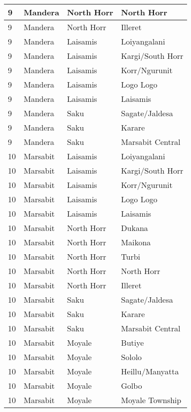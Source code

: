 \begin{table}[!ht]
\begin{tabular}{|l|l|l|l|}
        9 & Mandera & North Horr & North Horr \\ \hline
        9 & Mandera & North Horr & Illeret \\ \hline
        9 & Mandera & Laisamis & Loiyangalani \\ \hline
        9 & Mandera & Laisamis & Kargi/South Horr \\ \hline
        9 & Mandera & Laisamis & Korr/Ngurunit \\ \hline
        9 & Mandera & Laisamis & Logo Logo \\ \hline
        9 & Mandera & Laisamis & Laisamis \\ \hline
        9 & Mandera & Saku & Sagate/Jaldesa \\ \hline
        9 & Mandera & Saku & Karare \\ \hline
        9 & Mandera & Saku & Marsabit Central \\ \hline
        10 & Marsabit & Laisamis & Loiyangalani \\ \hline
        10 & Marsabit & Laisamis & Kargi/South Horr \\ \hline
        10 & Marsabit & Laisamis & Korr/Ngurunit \\ \hline
        10 & Marsabit & Laisamis & Logo Logo \\ \hline
        10 & Marsabit & Laisamis & Laisamis \\ \hline
        10 & Marsabit & North Horr & Dukana \\ \hline
        10 & Marsabit & North Horr & Maikona \\ \hline
        10 & Marsabit & North Horr & Turbi \\ \hline
        10 & Marsabit & North Horr & North Horr \\ \hline
        10 & Marsabit & North Horr & Illeret \\ \hline
        10 & Marsabit & Saku & Sagate/Jaldesa \\ \hline
        10 & Marsabit & Saku & Karare \\ \hline
        10 & Marsabit & Saku & Marsabit Central \\ \hline
        10 & Marsabit & Moyale & Butiye \\ \hline
        10 & Marsabit & Moyale & Sololo \\ \hline
        10 & Marsabit & Moyale & Heillu/Manyatta \\ \hline
        10 & Marsabit & Moyale & Golbo \\ \hline
        10 & Marsabit & Moyale & Moyale Township \\ \hline

\end{tabular}
\end{table}
